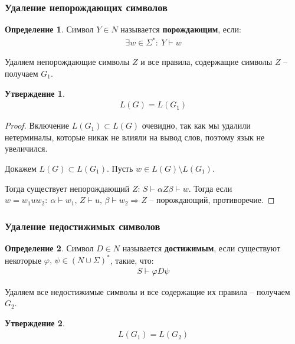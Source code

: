 \documentclass[a4paper,12pt]{article}
\renewcommand{\phi}{\ensuremath{\varphi}}
\theoremstyle{plain}
\newtheorem{proposition}{Утверждение}[subsection]
\theoremstyle{definition}
\newtheorem{definition}{Определение}[subsection]
\theoremstyle{remark}
\begin{document}
\subsubsection*{Удаление непорождающих символов}
\begin{definition}
	Символ $Y \in N$ называется \textbf{порождающим}, если:
	\begin{align*}{
			\exists} w \in \Sigma^* :\: Y \vdash w
	\end{align*}
\end{definition}

Удаляем непорождающие символы $Z$ и все правила, содержащие символы $Z$ -- получаем $G_1$.

\begin{proposition}
	\begin{align*}
		L(G) = L(G_1)
	\end{align*}
\end{proposition}

\begin{proof}
	Включение $L(G_1) \subset L(G)$ очевидно, так как мы удалили нетерминалы, которые никак не влияли на вывод слов, поэтому язык не увеличился.

	Докажем $L(G) \subset L(G_1)$. Пусть $w \in L(G) \setminus L(G_1)$.

	Тогда существует непорождающий $Z$: $S \vdash \alpha Z \beta \vdash w$. Тогда если $w = w_1uw_2:\: \alpha \vdash w_1,\, Z \vdash u,\, \beta \vdash w_2 \Rightarrow Z$ -- порождающий, противоречие.
\end{proof}

\subsubsection*{Удаление недостижимых символов}
\begin{definition}
	Символ $D \in N$ называется \textbf{достижимым}, если существуют некоторые $\phi,\, \psi \in (N \cup \Sigma)^*$, такие, что:
	\begin{align*}
		S \vdash \phi D \psi
	\end{align*}
\end{definition}

Удаляем все недостижимые символы и все содержащие их правила -- получаем $G_2$.

\begin{proposition}
	\begin{align*}
		L(G_1) = L(G_2)
	\end{align*}
\end{proposition}
\end{document}
